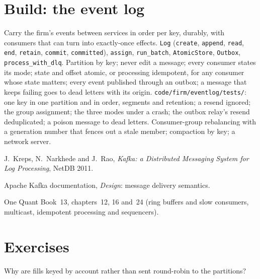 \section{Build: the event log}\label{bld:pl:messaging-and-event-driven-architecture:eventlog}

\begin{build}
 Carry the firm's events between services in order per key, durably, with consumers that can turn 
into exactly-once effects.
 \texttt{Log} (\texttt{create}, \texttt{append}, \texttt{read}, \texttt{end}, \texttt{retain}, \texttt{commit},
\texttt{committed}), \texttt{assign}, \texttt{run\_batch}, \texttt{AtomicStore}, \texttt{Outbox}, \texttt{process\_with\_dlq}.
 Partition by key; never edit a message; every consumer states its mode; state and offset atomic, or processing idempotent,
for any consumer whose state matters; every event published through an outbox; a message that keeps failing goes to dead letters with its
origin.
 \texttt{code/firm/eventlog/tests/}: one key in one partition and in order, segments and retention; a resend
ignored; the group assignment; the three modes under a crash; the outbox relay's resend deduplicated; a poison message to dead letters.
 Consumer-group rebalancing with a generation number that fences out a stale member; compaction by key; a network server.
\end{build}

\begin{omsources}
\item J.~Kreps, N.~Narkhede and J.~Rao, \emph{Kafka: a Distributed Messaging System for Log Processing}, NetDB 2011.
\item Apache Kafka documentation, \emph{Design}: message delivery semantics.
\item One Quant Book~13, chapters~12, 16 and~24 (ring buffers and slow consumers, multicast, idempotent processing and sequencers).
\end{omsources}

\section{Exercises}

\begin{exercise}[$\star$]\label{exo:pl:messaging-and-event-driven-architecture:1}
Why are fills keyed by account rather than sent round-robin to the partitions?
\end{exercise}


